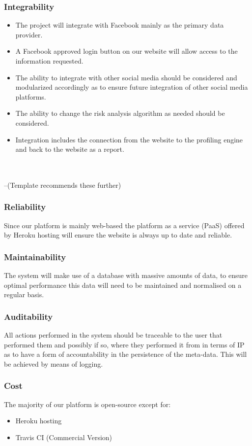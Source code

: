 \documentclass{article}
\begin{document}
		\subsubsection{Integrability}
		\begin{itemize}
			\item The project will integrate with Facebook mainly as the primary data provider.
			\item A Facebook approved login button on our website will allow access to the information requested. 
			\item The ability to integrate with other social media should be considered and modularized accordingly as to ensure future integration of other social media platforms. 
		\item The ability to change the risk analysis algorithm as needed should be considered.
		\item Integration includes the connection from the website to the profiling engine and back to the website as a report.
		\end{itemize}
		\\
		\\
		--(Template recommends these further)
		
		\subsubsection{Reliability}
		Since our platform is mainly web-based the platform as a service (PaaS) offered by Heroku hosting will ensure the website is always up to date and reliable.
		\subsubsection{Maintainability}
		The system will make use of a database with massive amounts of data, to ensure optimal performance this data will need to be maintained and normalised on a regular basis.
		\subsubsection{Auditability}
		 All actions performed in the system should be traceable to the user that performed them and possibly if so, where they performed it from in terms of IP as to have a form of accountability in the persistence of the meta-data. This will be achieved by means of logging.
		\subsubsection{Cost}
		The majority of our platform is open-source except for:
		\begin{itemize}
			\item Heroku hosting
			\item Travis CI (Commercial Version)		
		\end{itemize}
\end{document}
